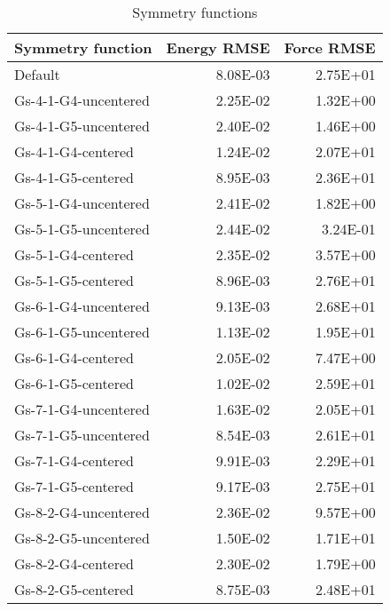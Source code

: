 \begin{table}
\begin{tabular}{lrr}
\toprule
    Symmetry function &  Energy RMSE &  Force RMSE \\
\midrule
              Default &     8.08E-03 &    2.75E+01 \\
 Gs-4-1-G4-uncentered &     2.25E-02 &    1.32E+00 \\
 Gs-4-1-G5-uncentered &     2.40E-02 &    1.46E+00 \\
   Gs-4-1-G4-centered &     1.24E-02 &    2.07E+01 \\
   Gs-4-1-G5-centered &     8.95E-03 &    2.36E+01 \\
 Gs-5-1-G4-uncentered &     2.41E-02 &    1.82E+00 \\
 Gs-5-1-G5-uncentered &     2.44E-02 &    3.24E-01 \\
   Gs-5-1-G4-centered &     2.35E-02 &    3.57E+00 \\
   Gs-5-1-G5-centered &     8.96E-03 &    2.76E+01 \\
 Gs-6-1-G4-uncentered &     9.13E-03 &    2.68E+01 \\
 Gs-6-1-G5-uncentered &     1.13E-02 &    1.95E+01 \\
   Gs-6-1-G4-centered &     2.05E-02 &    7.47E+00 \\
   Gs-6-1-G5-centered &     1.02E-02 &    2.59E+01 \\
 Gs-7-1-G4-uncentered &     1.63E-02 &    2.05E+01 \\
 Gs-7-1-G5-uncentered &     8.54E-03 &    2.61E+01 \\
   Gs-7-1-G4-centered &     9.91E-03 &    2.29E+01 \\
   Gs-7-1-G5-centered &     9.17E-03 &    2.75E+01 \\
 Gs-8-2-G4-uncentered &     2.36E-02 &    9.57E+00 \\
 Gs-8-2-G5-uncentered &     1.50E-02 &    1.71E+01 \\
   Gs-8-2-G4-centered &     2.30E-02 &    1.79E+00 \\
   Gs-8-2-G5-centered &     8.75E-03 &    2.48E+01 \\
\bottomrule
\end{tabular}
\caption{Symmetry functions}
\label{table:symmetry}
\end{table}

